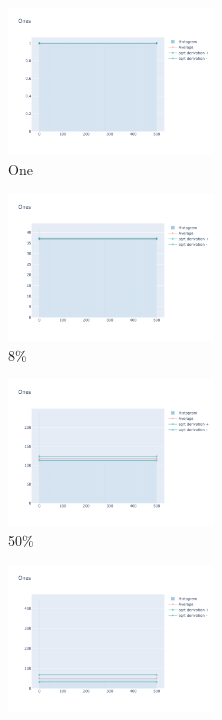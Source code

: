 \documentclass[12pt, fleqn]{report}                             %
\theoremstyle{break}                                            %
\begin{document}
      \begin{figure}[ht!]
        \centering
        \begin{subfigure}[b]{0.4\linewidth}
          \includegraphics[width=0.6\textwidth]{Images/10/dia-a.png}
          \caption{One}
        \end{subfigure}
        \begin{subfigure}[b]{0.4\linewidth}
          \includegraphics[width=0.6\textwidth]{Images/10/dia-b.png}
          \caption{8\%}
        \end{subfigure}
        \begin{subfigure}[b]{0.4\linewidth}
          \includegraphics[width=0.6\textwidth]{Images/10/dia-c.png}
          \caption{50\%}
        \end{subfigure}
        \begin{subfigure}[b]{0.4\linewidth}
          \includegraphics[width=0.6\textwidth]{Images/10/dia-d.png}

\end{subfigure}
\end{figure}
\end{document}
